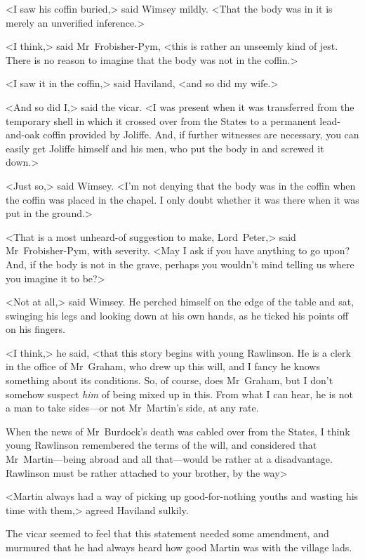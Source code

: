 <I saw his coffin buried,> said Wimsey mildly. <That the body was in it is merely an unverified inference.>

<I think,> said Mr~Frobisher-Pym, <this is rather an unseemly kind of jest. There is no reason to imagine that the body was not in the coffin.>

<I saw it in the coffin,> said Haviland, <and so did my wife.>

<And so did I,> said the vicar. <I was present when it was transferred from the temporary shell in which it crossed over from the States to a permanent lead-and-oak coffin provided by Joliffe. And, if further witnesses are necessary, you can easily get Joliffe himself and his men, who put the body in and screwed it down.>

<Just so,> said Wimsey. <I'm not denying that the body was in the coffin when the coffin was placed in the chapel. I only doubt whether it was there when it was put in the ground.>

<That is a most unheard-of suggestion to make, Lord~Peter,> said Mr~Frobisher-Pym, with severity. <May I ask if you have anything to go upon? And, if the body is not in the grave, perhaps you wouldn't mind telling us where you imagine it to be?>

<Not at all,> said Wimsey. He perched himself on the edge of the table and sat, swinging his legs and looking down at his own hands, as he ticked his points off on his fingers.

<I think,> he said, <that this story begins with young Rawlinson. He is a clerk in the office of Mr~Graham, who drew up this will, and I fancy he knows something about its conditions. So, of course, does Mr~Graham, but I don't somehow suspect \textit{him} of being mixed up in this. From what I can hear, he is not a man to take sides—or not Mr~Martin's side, at any rate.

When the news of Mr~Burdock's death was cabled over from the States, I think young Rawlinson remembered the terms of the will, and considered that Mr~Martin—being abroad and all that—would be rather at a disadvantage. Rawlinson must be rather attached to your brother, by the way\longdash>

<Martin always had a way of picking up good-for-nothing youths and wasting his time with them,> agreed Haviland sulkily.

The vicar seemed to feel that this statement needed some amendment, and murmured that he had always heard how good Martin was with the village lads.

